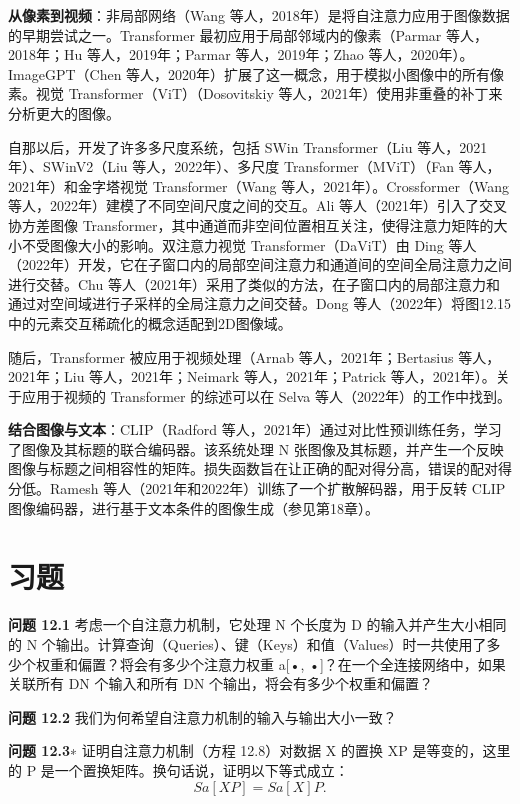 \documentclass[lang=cn,newtx,10pt,scheme=chinese]{elegantbook}
\begin{document}
\textbf{从像素到视频}：非局部网络（Wang 等人，2018年）是将自注意力应用于图像数据的早期尝试之一。Transformer 最初应用于局部邻域内的像素（Parmar 等人，2018年；Hu 等人，2019年；Parmar 等人，2019年；Zhao 等人，2020年）。ImageGPT（Chen 等人，2020年）扩展了这一概念，用于模拟小图像中的所有像素。视觉 Transformer（ViT）（Dosovitskiy 等人，2021年）使用非重叠的补丁来分析更大的图像。

自那以后，开发了许多多尺度系统，包括 SWin Transformer（Liu 等人，2021年）、SWinV2（Liu 等人，2022年）、多尺度 Transformer（MViT）（Fan 等人，2021年）和金字塔视觉 Transformer（Wang 等人，2021年）。Crossformer（Wang 等人，2022年）建模了不同空间尺度之间的交互。Ali 等人（2021年）引入了交叉协方差图像 Transformer，其中通道而非空间位置相互关注，使得注意力矩阵的大小不受图像大小的影响。双注意力视觉 Transformer（DaViT）由 Ding 等人（2022年）开发，它在子窗口内的局部空间注意力和通道间的空间全局注意力之间进行交替。Chu 等人（2021年）采用了类似的方法，在子窗口内的局部注意力和通过对空间域进行子采样的全局注意力之间交替。Dong 等人（2022年）将图12.15中的元素交互稀疏化的概念适配到2D图像域。

随后，Transformer 被应用于视频处理（Arnab 等人，2021年；Bertasius 等人，2021年；Liu 等人，2021年；Neimark 等人，2021年；Patrick 等人，2021年）。关于应用于视频的 Transformer 的综述可以在 Selva 等人（2022年）的工作中找到。

\textbf{结合图像与文本}：CLIP（Radford 等人，2021年）通过对比性预训练任务，学习了图像及其标题的联合编码器。该系统处理 N 张图像及其标题，并产生一个反映图像与标题之间相容性的矩阵。损失函数旨在让正确的配对得分高，错误的配对得分低。Ramesh 等人（2021年和2022年）训练了一个扩散解码器，用于反转 CLIP 图像编码器，进行基于文本条件的图像生成（参见第18章）。


\section{习题}
\textbf{问题 12.1} 考虑一个自注意力机制，它处理 N 个长度为 D 的输入并产生大小相同的 N 个输出。计算查询（Queries）、键（Keys）和值（Values）时一共使用了多少个权重和偏置？将会有多少个注意力权重 a[•, •]？在一个全连接网络中，如果关联所有 DN 个输入和所有 DN 个输出，将会有多少个权重和偏置？

\textbf{问题 12.2} 我们为何希望自注意力机制的输入与输出大小一致？

\textbf{问题 12.3}∗ 证明自注意力机制（方程 12.8）对数据 X 的置换 XP 是等变的，这里的 P 是一个置换矩阵。换句话说，证明以下等式成立：
\begin{equation}
Sa[XP] = Sa[X]P. 
\end{equation}
\end{document}
